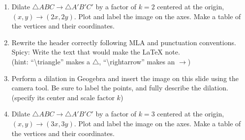 \documentclass[12pt, twoside]{article}
\begin{document}
\begin{enumerate}
\newpage
\item Dilate $\triangle ABC \rightarrow \triangle A'B'C'$ by a factor of $k=2$ centered at the origin, $(x,y) \rightarrow (2x, 2y)$. Plot and label the image on the axes. Make a table of the vertices and their coordinates.
\begin{flushright}
\end{flushright}

\newpage
\item Rewrite the header correctly following MLA and punctuation conventions.\\[0.5cm]
Spicy: Write the text that would make the LaTeX note. \\
(hint: ``\textbackslash triangle'' makes a $\triangle$, ``\textbackslash rightarrow'' makes an $\rightarrow$)

\newpage
\item Perform a dilation in Geogebra and insert the image on this slide using the camera tool. Be sure to label the points, and fully describe the dilation. (specify its center and scale factor $k$)

\newpage
\item Dilate $\triangle ABC \rightarrow \triangle A'B'C'$ by a factor of $k=3$ centered at the origin, $(x,y) \rightarrow (3x, 3y)$. Plot and label the image on the axes. Make a table of the vertices and their coordinates.
\begin{flushright}
\end{flushright}

\end{enumerate}
\end{document}
